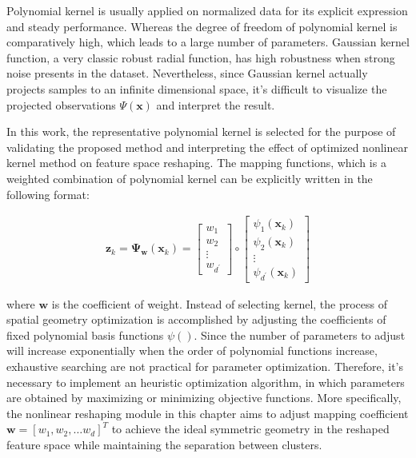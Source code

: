Polynomial kernel is usually applied on normalized data for its explicit expression and steady performance. Whereas the degree of freedom of polynomial kernel is comparatively high, which leads to a large number of parameters. Gaussian kernel function, a very classic robust radial function, has high robustness when strong noise presents in the dataset. Nevertheless, since Gaussian kernel actually projects samples to an infinite dimensional space, it's difficult to visualize the projected observations $\Psi(\mathbf{x})$ and interpret the result. %

In this work, the representative polynomial kernel is selected for the purpose of validating the proposed method and interpreting the effect of optimized nonlinear kernel method on feature space reshaping. The mapping functions, which is a weighted combination of polynomial kernel can be explicitly written in the following format:

\begin{align}
\mathbf{z}_k
=\mathbf{\Psi_{w}} (\mathbf{x}_k) = 
\begin{bmatrix}
w_{1}  \\
w_{2}   \\
\vdots \\
w_{d^\prime} 
\end{bmatrix}
\circ
\begin{bmatrix}
\psi_1(\mathbf{x}_k)\\
\psi_2(\mathbf{x}_k)\\
\vdots\\
\psi_{d^\prime}(\mathbf{x}_k)
\end{bmatrix}
\label{eq:z}
\end{align}

where $\mathbf{w}$ is the coefficient of weight. Instead of selecting kernel, %
the process of spatial geometry optimization is accomplished by adjusting the coefficients of fixed polynomial basis functions $\psi()$. Since the number of parameters to adjust will increase exponentially when the order of polynomial functions increase, exhaustive searching are not practical for parameter optimization. Therefore, it's necessary to implement an heuristic optimization algorithm, in which parameters are obtained by maximizing or minimizing objective functions. More specifically, the nonlinear reshaping module in this chapter aims to adjust mapping coefficient  $\mathbf{w} = [w_1,w_2,\dots w_d]^T$ to achieve the ideal symmetric geometry in the reshaped feature space while maintaining the separation between clusters.


